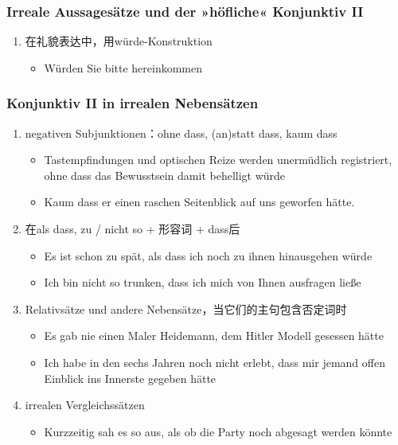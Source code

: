 \documentclass[UTF8]{report}
\begin{document}
\subsubsection{Irreale Aussagesätze und der »höfliche« Konjunktiv II}
\begin{enumerate}
    \item 在礼貌表达中，用würde-Konstruktion
    \begin{itemize}
        \item Würden Sie bitte hereinkommen
    \end{itemize}
\end{enumerate}

\subsubsection{Konjunktiv II in irrealen Nebensätzen}
\begin{enumerate}
    \item negativen Subjunktionen：ohne dass, (an)statt dass, kaum dass
    \begin{itemize}
        \item Tastempfindungen und optischen Reize werden unermüdlich registriert, ohne dass das Bewusstsein damit behelligt würde
        \item Kaum dass er einen raschen Seitenblick auf uns geworfen hätte.
    \end{itemize}
    \item 在als dass, zu / nicht so + 形容词 + dass后
    \begin{itemize}
        \item Es ist schon zu spät, als dass ich noch zu ihnen hinausgehen würde
        \item Ich bin nicht so trunken, dass ich mich von Ihnen ausfragen ließe
    \end{itemize}
    \item Relativsätze und andere Nebensätze，当它们的主句包含否定词时
    \begin{itemize}
        \item Es gab nie einen Maler Heidemann, dem Hitler Modell gesessen hätte
        \item  Ich habe in den sechs Jahren noch nicht erlebt, dass mir jemand offen Einblick ins Innerste gegeben hätte
    \end{itemize}
    \item irrealen Vergleichssätzen
    \begin{itemize}
        \item Kurzzeitig sah es so aus, als ob die Party noch abgesagt werden könnte
    \end{itemize}
\end{enumerate}
\end{document}
